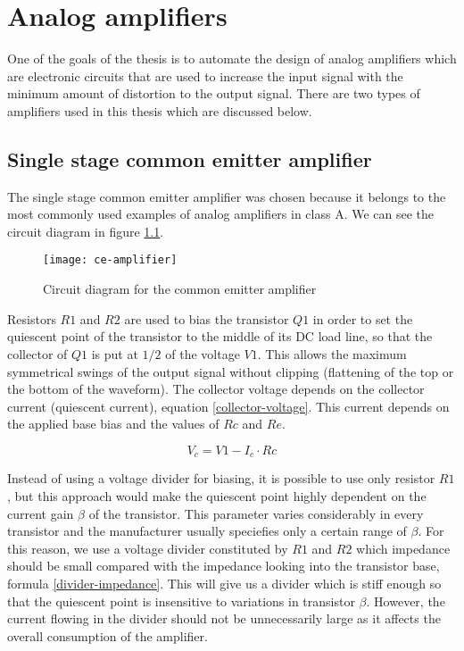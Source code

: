 \chapter{Analog amplifiers}
One of the goals of the thesis is to automate the design of analog amplifiers which are electronic circuits that are used to increase the input signal with the minimum amount of distortion to the output signal. There are two types of amplifiers used in this thesis which are discussed below.

\section{Single stage common emitter amplifier} \label{ce-amp}
The single stage common emitter amplifier was chosen because it belongs to the most commonly used examples of analog amplifiers in class A. We can see the circuit diagram in figure \ref{ce-amplifier}.

\begin{figure}[H]
    \centering
    \texttt{[image: ce-amplifier]}\label{ce-amplifier}
    \caption{Circuit diagram for the common emitter amplifier}
\end{figure}

Resistors $R1$ and $R2$ are used to bias the transistor $Q1$ in order to set the quiescent point of the transistor to the middle of its DC load line, so that the collector of $Q1$ is put at $1/2$ of the voltage $V1$. This allows the maximum symmetrical swings of the output signal without clipping (flattening of the top or the bottom of the waveform). The collector voltage depends on the collector current (quiescent current), equation \ref{collector-voltage}. This current depends on the applied base bias and the values of $Rc$ and $Re$.

\begin{equation} \label{collector-voltage}
    V_c = V1 - I_c \cdot Rc
\end{equation}

Instead of using a voltage divider for biasing, it is possible to use only resistor $R1$, but this approach would make the quiescent point highly dependent on the current gain $\beta$ of the transistor. This parameter varies considerably in every transistor and the manufacturer usually speciefies only a certain range of $\beta$. For this reason, we use a voltage divider constituted by $R1$ and $R2$ which impedance should be small compared with the impedance looking into the transistor base, formula \ref{divider-impedance}. This will give us a divider which is stiff enough so that the quiescent point is insensitive to variations in transistor $\beta$. However, the current flowing in the divider should not be unnecessarily large as it affects the overall consumption of the amplifier.


